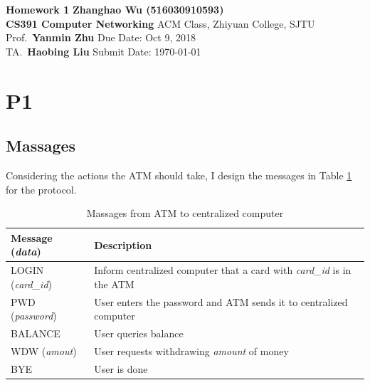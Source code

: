 \documentclass[a4paper, 11pt]{article}
\begin{document}
\noindent
\large\textbf{Homework 1} \hfill \textbf{Zhanghao Wu (516030910593)} \\
\normalsize {\bf CS391 Computer Networking} \hfill ACM Class, Zhiyuan College, SJTU\\
Prof.~{\bf Yanmin Zhu} \hfill Due Date: Oct 9, 2018\\
TA.~{\bf Haobing Liu} \hfill Submit Date: \today

\section*{P1}
\subsection*{Massages}
Considering the actions the ATM should take, I design the messages in Table \ref{tab:atm} for the protocol.
\begin{table}[htbp]
	\centering
	\caption{Massages from ATM to centralized computer}
	\label{tab:atm}
	\begin{tabular}{@{}ll@{}}
		\toprule
		Message (\textit{data})   & Description                                                                   \\ \midrule
		LOGIN (\textit{card\_id}) & Inform centralized computer that a card with \textit{card\_id} is in the ATM \\
		PWD (\textit{password})   & User enters the password and ATM sends it to centralized computer            \\
		BALANCE                   & User queries balance                                                        \\
		WDW (\textit{amout})      & User requests withdrawing \textit{amount} of money                           \\
		BYE                       & User is done                                                                 \\ \bottomrule
	\end{tabular}
\end{table}
\end{document}

